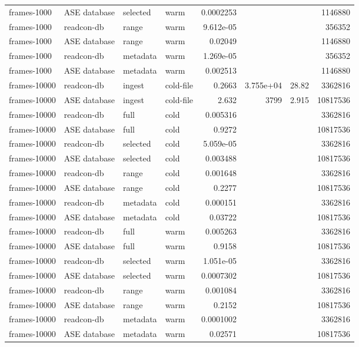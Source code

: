 {\begin{longtable}{@{}llllrrrr@{}}
frames-1000 & ASE database & selected & warm & 0.0002253 &  &  & 1146880 \\
frames-1000 & readcon-db & range & warm & 9.612e-05 &  &  & 356352 \\
frames-1000 & ASE database & range & warm & 0.02049 &  &  & 1146880 \\
frames-1000 & readcon-db & metadata & warm & 1.269e-05 &  &  & 356352 \\
frames-1000 & ASE database & metadata & warm & 0.002513 &  &  & 1146880 \\
frames-10000 & readcon-db & ingest & cold-file & 0.2663 & 3.755e+04 & 28.82 & 3362816 \\
frames-10000 & ASE database & ingest & cold-file & 2.632 & 3799 & 2.915 & 10817536 \\
frames-10000 & readcon-db & full & cold & 0.005316 &  &  & 3362816 \\
frames-10000 & ASE database & full & cold & 0.9272 &  &  & 10817536 \\
frames-10000 & readcon-db & selected & cold & 5.059e-05 &  &  & 3362816 \\
frames-10000 & ASE database & selected & cold & 0.003488 &  &  & 10817536 \\
frames-10000 & readcon-db & range & cold & 0.001648 &  &  & 3362816 \\
frames-10000 & ASE database & range & cold & 0.2277 &  &  & 10817536 \\
frames-10000 & readcon-db & metadata & cold & 0.000151 &  &  & 3362816 \\
frames-10000 & ASE database & metadata & cold & 0.03722 &  &  & 10817536 \\
frames-10000 & readcon-db & full & warm & 0.005263 &  &  & 3362816 \\
frames-10000 & ASE database & full & warm & 0.9158 &  &  & 10817536 \\
frames-10000 & readcon-db & selected & warm & 1.051e-05 &  &  & 3362816 \\
frames-10000 & ASE database & selected & warm & 0.0007302 &  &  & 10817536 \\
frames-10000 & readcon-db & range & warm & 0.001084 &  &  & 3362816 \\
frames-10000 & ASE database & range & warm & 0.2152 &  &  & 10817536 \\
frames-10000 & readcon-db & metadata & warm & 0.0001002 &  &  & 3362816 \\
frames-10000 & ASE database & metadata & warm & 0.02571 &  &  & 10817536 \\

\end{longtable}}
